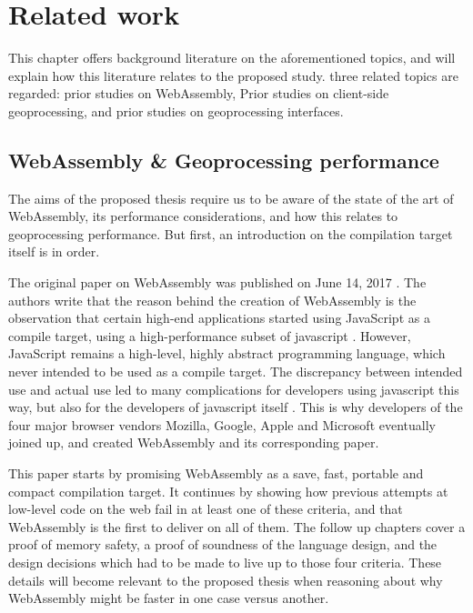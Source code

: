 \newpage

\section{Related work}

This chapter offers background literature on the aforementioned topics, and will explain how this literature relates to the proposed study. three related topics are regarded: prior studies on WebAssembly, Prior studies on client-side geoprocessing, and prior studies on geoprocessing interfaces.



\subsection{WebAssembly \& Geoprocessing performance}

The aims of the proposed thesis require us to be aware of the state of the art of WebAssembly, its performance considerations, and how this relates to geoprocessing performance. But first, an introduction on the compilation target itself is in order.

The original paper on WebAssembly was published on June 14, 2017 \cite{haas_bringing_2017}. The authors write that the reason behind the creation of WebAssembly is the observation that certain high-end applications started using JavaScript as a compile target, using a high-performance subset of javascript \cite{mozilla_asmjs_2013}. However, JavaScript remains a high-level, highly abstract programming language, which never intended to be used as a compile target. The discrepancy between intended use and actual use led to many complications for developers using javascript this way, but also for the developers of javascript itself \cite{haas_bringing_2017}. This is why developers of the four major browser vendors Mozilla, Google, Apple and Microsoft eventually joined up, and created WebAssembly and its corresponding paper. %

This paper starts by promising WebAssembly as a save, fast, portable and compact compilation target. It continues by showing how previous attempts at low-level code on the web fail in at least one of these criteria, and that WebAssembly is the first to deliver on all of them. The follow up chapters cover a proof of memory safety, a proof of soundness of the language design, and the design decisions which had to be made to live up to those four criteria. These details will become relevant to the proposed thesis when reasoning about why WebAssembly might be faster in one case versus another.

